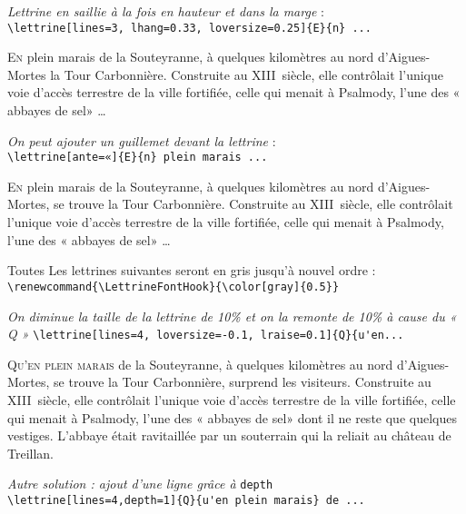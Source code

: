 \documentclass[12pt,a4paper,german,french]{article}
\begin{document}
\vspace{\baselineskip}
\textit{Lettrine en saillie à la fois en hauteur et dans la marge} :\\
\verb+\lettrine[lines=3, lhang=0.33, loversize=0.25]{E}{n} ...+

\lettrine[lines=3, lhang=0.33, loversize=0.25]{E}{n}
plein marais de la Souteyranne,
à quelques kilomètres au nord d'Aigues-Mortes la Tour Carbonnière.
Construite au XIII\ieme~siècle, elle contrôlait l'unique voie d'accès
terrestre de la ville fortifiée, celle qui menait à Psalmody,
l'une des « abbayes de sel» \dots

\vspace{\baselineskip}
\textit{On peut ajouter un guillemet devant la lettrine} :\\
\verb+\lettrine[ante=«]{E}{n} plein marais ...+

\lettrine[ante=«]{E}{n} plein marais de la Souteyranne,
à quelques kilomètres au nord d'Aigues-Mortes, se trouve
la Tour Carbonnière.
Construite au XIII\ieme~siècle, elle contrôlait l'unique voie d'accès
terrestre de la ville fortifiée, celle qui menait à Psalmody,
l'une des « abbayes de sel» \dots

\newpage
Toutes Les lettrines suivantes  seront en gris jusqu'à nouvel ordre : \\
\verb+\renewcommand{\LettrineFontHook}{\color[gray]{0.5}}+
\renewcommand{\LettrineFontHook}{\color[gray]{0.5}}

\vspace{.5\baselineskip}
\textit{On diminue la taille de la lettrine de 10\% et on
la remonte de 10\%  à cause du « Q »}
\verb+\lettrine[lines=4, loversize=-0.1, lraise=0.1]{Q}{u'en...+

\lettrine[lines=4, loversize=-0.1, lraise=0.1]{Q}{u'en plein marais}
 de la Souteyranne, à quelques kilomètres au nord d'Aigues-Mortes,
se trouve la Tour Carbonnière, surprend les visiteurs.
Construite au XIII\ieme~siècle, elle contrôlait l'unique voie d'accès
terrestre de la ville fortifiée, celle qui menait à Psalmody,
l'une des « abbayes de sel» dont il ne reste que quelques vestiges.
L'abbaye était ravitaillée par un souterrain qui
la reliait au château de Treillan.

\vspace{.5\baselineskip}
\textit{Autre solution : ajout d’une ligne grâce à} \verb+depth+\\
\verb+\lettrine[lines=4,depth=1]{Q}{u'en plein marais} de ...+
\end{document}
